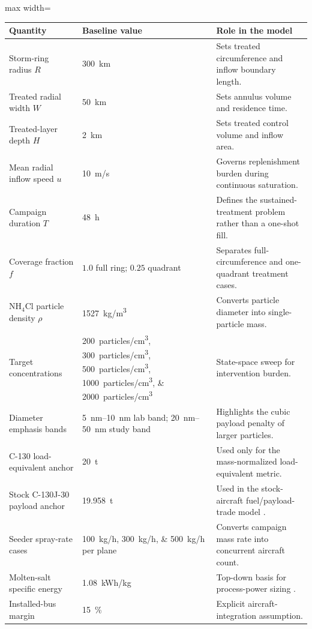 \documentclass[8pt,twocolumn]{extarticle}
\begin{document}
\begin{table}[t]
\centering
\small
\setlength{\tabcolsep}{4pt}
\renewcommand{\arraystretch}{1.15}
\begin{adjustbox}{max width=\textwidth}
\begin{tabular}{p{} p{} p{}}
\toprule
\textbf{Quantity} & \textbf{Baseline value} & \textbf{Role in the model} \\
\midrule
Storm-ring radius $R$ & \SI{300}{km} & Sets treated circumference and inflow boundary length. \\
Treated radial width $W$ & \SI{50}{km} & Sets annulus volume and residence time. \\
Treated-layer depth $H$ & \SI{2}{km} & Sets treated control volume and inflow area. \\
Mean radial inflow speed $u$ & \SI{10}{m/s} & Governs replenishment burden during continuous saturation. \\
Campaign duration $T$ & \SI{48}{h} & Defines the sustained-treatment problem rather than a one-shot fill. \\
Coverage fraction $f$ & $1.0$ full ring; $0.25$ quadrant & Separates full-circumference and one-quadrant treatment cases. \\
NH$_4$Cl particle density $\rho$ & \SI{1527}{kg/m^3} & Converts particle diameter into single-particle mass. \\
Target concentrations & \SIlist{200;300;500;1000;2000}{particles/cm^3} & State-space sweep for intervention burden. \\
Diameter emphasis bands & \SIrange{5}{10}{nm} lab band; \SIrange{20}{50}{nm} study band & Highlights the cubic payload penalty of larger particles. \\
C-130 load-equivalent anchor & \SI{20}{t} & Used only for the mass-normalized load-equivalent metric. \\
Stock C-130J-30 payload anchor & \SI{19.958}{t} & Used in the stock-aircraft fuel/payload-trade model \citep{LockheedC130J30}. \\
Seeder spray-rate cases & \SIlist{100;300;500}{kg/h} per plane & Converts campaign mass rate into concurrent aircraft count. \\
Molten-salt specific energy & \SI{1.08}{kWh/kg} & Top-down basis for process-power sizing \citep{AeolusMoltenSaltProposal,AeolusPowerNote}. \\
Installed-bus margin & \SI{15}{\percent} & Explicit aircraft-integration assumption. \\

\end{tabular}
\end{adjustbox}
\end{table}
\end{document}
